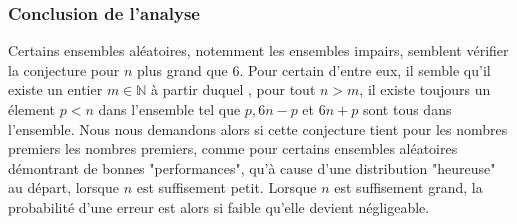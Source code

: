 \documentclass[../main.text]{report}
\begin{document}
\subsubsection{Conclusion de l'analyse}
Certains ensembles aléatoires, notemment les ensembles impairs, semblent vérifier la conjecture pour $n$ plus grand que 6. Pour certain d'entre eux, il semble qu'il existe un entier $m \in \mathbb{N}$ à partir duquel , pour tout $n > m$, il existe toujours un élement $p < n$ dans l'ensemble tel que $p, 6n-p$ et $6n+p$ sont tous dans l'ensemble. Nous nous demandons alors si cette conjecture tient pour les nombres premiers les nombres premiers, comme pour certains ensembles aléatoires démontrant de bonnes "performances", qu'à cause d'une distribution "heureuse" au départ, lorsque $n$ est suffisement petit. Lorsque $n$ est suffisement grand, la probabilité d'une erreur est alors si faible qu'elle devient négligeable.  



\end{document}

